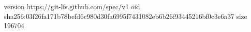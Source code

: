 version https://git-lfs.github.com/spec/v1
oid sha256:03f26fa171b78befd6c980d30fa6995f7431082eb6b26f93445216bf0c3e6a37
size 196704
